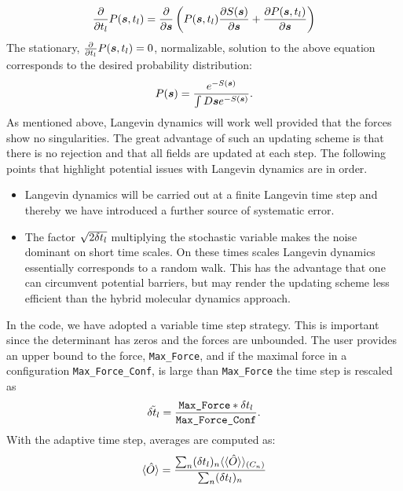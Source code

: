 \begin{equation}
         \frac{\partial  }{\partial   t_{l}}  P( \boldsymbol{s}, t_{l})  =  \frac{\partial  }{\partial    \boldsymbol{s} }  \left( P( \boldsymbol{s}, t_{l})  \frac{\partial S(\boldsymbol{s}) }{\partial     \boldsymbol{s} }   +
          \frac{\partial P(\boldsymbol{s},t_{l}) }{\partial     \boldsymbol{s} }
         \right)
\end{equation}
The stationary,  $ \frac{\partial  }{\partial   t_{l}}  P( \boldsymbol{s}, t_{l}) =0$,  normalizable,  solution to the above equation corresponds to the desired probability distribution:
\begin{equation}
          P(\boldsymbol{s}) =  \frac{ e^{ - S(\boldsymbol{s}) } }   {   \int D \boldsymbol{s}  e^{ - S(\boldsymbol{s}) } }.
\end{equation}
As mentioned above, Langevin dynamics will work well  provided that  the forces show  no  singularities.     The great advantage of such an updating scheme is that there is no rejection and  that all  fields are updated at each step.  The following points that highlight potential issues with Langevin dynamics are in order.
\begin{itemize}
\item   Langevin dynamics will be carried out at a finite  Langevin time step and thereby we have introduced a further source of systematic error.
\item   The factor $\sqrt{2 \delta t_{l}} $   multiplying the stochastic variable makes the  noise dominant  on short time scales.  On these times scales  Langevin dynamics essentially  corresponds to a random walk. This has the advantage that one can circumvent potential barriers, but  may render the updating scheme less  efficient than the hybrid molecular  dynamics approach.
\end{itemize}
In the code, we have adopted a  variable time step strategy. This is important since   the determinant has zeros and the forces  are unbounded.    The user   provides an upper bound to the force, \texttt{Max\_Force},  and  if the maximal force in a configuration \texttt{Max\_Force\_Conf}, is large than \texttt{Max\_Force} the time step  is rescaled as 
\begin{equation}
     \tilde{\delta t_{l}}   =  \frac{ \texttt{Max\_Force} *  \delta t_{l} }{\texttt{Max\_Force\_Conf}}.
\end{equation}
With the adaptive time  step,  averages are computed as: 
\begin{equation}
   \langle \hat{O} \rangle = \frac{ \sum_n (\delta t_{l} )_n \langle \langle \hat{O} \rangle   \rangle_{(C_n)}} {\sum_n (\delta t_{l} )_n } 
\end{equation}



